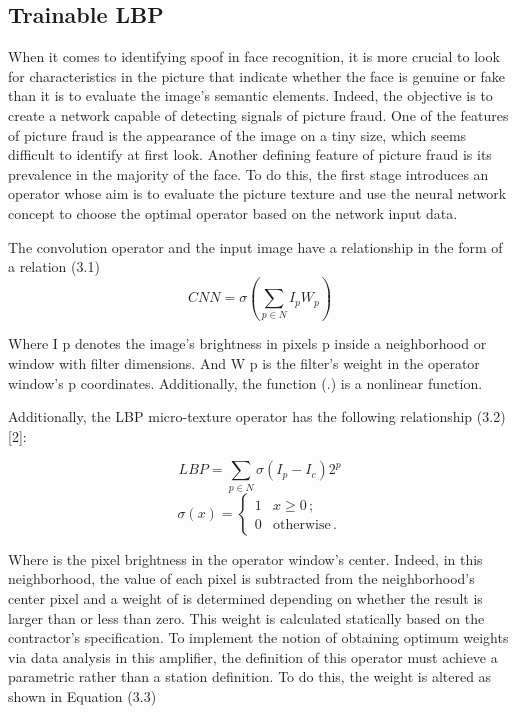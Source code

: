 \documentclass[journal]{IEEEtran}
\begin{document}
\subsection{Trainable LBP}
When it comes to identifying spoof in face recognition, it is more crucial to look for characteristics in the picture that indicate whether the face is genuine or fake than it is to evaluate the image's semantic elements. Indeed, the objective is to create a network capable of detecting signals of picture fraud. One of the features of picture fraud is the appearance of the image on a tiny size, which seems difficult to identify at first look. Another defining feature of picture fraud is its prevalence in the majority of the face. To do this, the first stage introduces an operator whose aim is to evaluate the picture texture and use the neural network concept to choose the optimal operator based on the network input data.

The convolution operator and the input image have a relationship in the form of a 
relation (3.1)
\begin{equation}\label{eq:cnn}
	CNN=\sigma(\sum_{p\in N}I_pW_p)
\end{equation}

Where I p denotes the image's brightness in pixels p inside a neighborhood or window with filter dimensions. And W p is the filter's weight in the operator window's p coordinates. Additionally, the function (.) is a nonlinear function.

Additionally, the LBP micro-texture operator has the following relationship (3.2) [2]:

\begin{equation}\label{eq:lbp}
	LBP=\sum_{p\in N}\sigma(I_p-I_c)2^p 
\end{equation}
\[ \sigma(x) = 
\begin{cases} 1  & \text{$x \geq 0 $}\,; \\
	0  & \text{otherwise}\,.
\end{cases} \]

Where  is the pixel brightness in the operator window's center. Indeed, in this neighborhood, the value of each pixel is subtracted from the neighborhood's center pixel and a weight of is determined depending on whether the result is larger than or less than zero. This weight is calculated statically based on the contractor's specification.
To implement the notion of obtaining optimum weights via data analysis in this amplifier, the definition of this operator must achieve a parametric rather than a station definition. To do this, the weight  is altered as shown in Equation (3.3)
\end{document}
